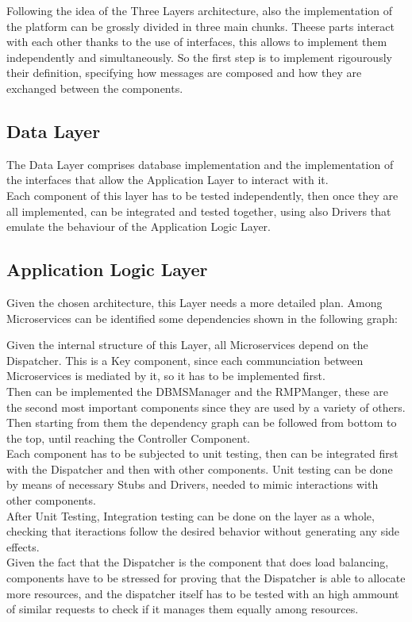 Following the idea of the Three Layers architecture, also the implementation of the platform can be grossly divided in three main chunks.
Theese parts interact with each other thanks to the use of interfaces, this allows to implement them independently and simultaneously. So the first step is to implement rigourously their definition, specifying how messages are composed and how they are exchanged between the components.\\

\subsection{Data Layer}
The Data Layer comprises database implementation and the implementation of the interfaces that allow the Application Layer to interact with it.\\
Each component of this layer has to be tested independently, then once they are all implemented, can be integrated and tested together, using also Drivers that emulate the behaviour of the Application Logic Layer.\\
\subsection{Application Logic Layer}
Given the chosen architecture, this Layer needs a more detailed plan. Among Microservices can be identified some dependencies shown in the following graph:


Given the internal structure of this Layer, all Microservices depend on the Dispatcher. This is a Key component, since each communciation between Microservices is mediated by it, so it has to be implemented first.\\
Then can be implemented the DBMSManager and the RMPManger, these are the second most important components since they are used by a variety of others. Then starting from them the dependency graph can be followed from bottom to the top, until reaching the Controller Component.\\
Each component has to be subjected to unit testing, then can be integrated first with the Dispatcher and then with other components. Unit testing can be done by means of necessary Stubs and Drivers, needed to mimic interactions with other components.\\
After Unit Testing, Integration testing can be done on the layer as a whole, checking that iteractions follow the desired behavior without generating any side effects.\\
Given the fact that the Dispatcher is the component that does load balancing, components have to be stressed for proving that the Dispatcher is able to allocate more resources, and the dispatcher itself has to be tested with an high ammount of similar requests to check if it manages them equally among resources.\\


